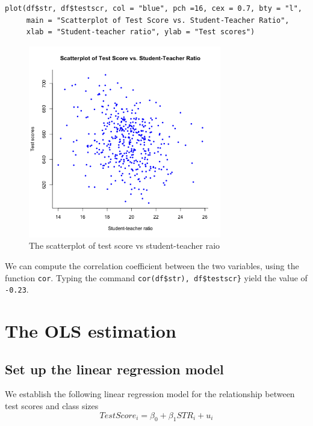 \documentclass[11pt]{article}
\begin{document}
\begin{verbatim}
plot(df$str, df$testscr, col = "blue", pch =16, cex = 0.7, bty = "l",
     main = "Scatterplot of Test Score vs. Student-Teacher Ratio",
     xlab = "Student-teacher ratio", ylab = "Test scores")
\end{verbatim}

\begin{figure}[htbp]
\centering
\includegraphics[width=0.75\textwidth]{fig42.png}
\caption{\label{fig:org0c1f61b}
The scatterplot of test score vs student-teacher raio}
\end{figure}

We can compute the correlation coefficient
between the two variables, using the function \texttt{cor}. Typing the
command \texttt{cor(df\$str), df\$testscr\}} yield the value of
\texttt{-0.23}.


\section{The OLS estimation}
\label{sec:org13997a0}

\subsection{Set up the linear regression model}
\label{sec:orgde880db}

We establish the following linear regression model for the relationship between
test scores and class sizes
\begin{equation}
\label{eq:testscr-str-1}
TestScore_i = \beta_0 + \beta_1 STR_i + u_i
\end{equation}
\end{document}
